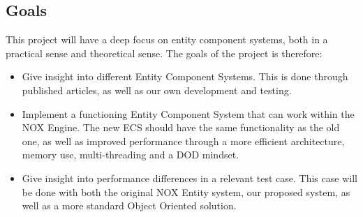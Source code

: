 \subsection{Goals}
This project will have a deep focus on entity component systems, both in a practical sense and theoretical sense.
The goals of the project is therefore:
\begin{itemize}
    \item 
        Give insight into different Entity Component Systems. 
        This is done through published articles, as well as our own development and testing.
    
    \item 
        Implement a functioning Entity Component System that can work within the NOX Engine.
        The new ECS should have the same functionality as the old one, as well as improved performance
        through a more efficient architecture, memory use, multi-threading and a DOD mindset.

    \item
        Give insight into performance differences in a relevant test case. 
        This case will be done with both the original NOX Entity system, our proposed system,
        as well as a more standard Object Oriented solution.
\end{itemize}